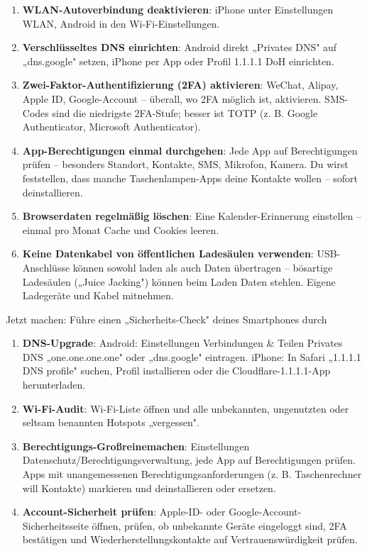 \begin{enumerate}
  \item \textbf{WLAN-Autoverbindung deaktivieren}: iPhone unter Einstellungen WLAN, Android in den Wi-Fi-Einstellungen.
  \item \textbf{Verschlüsseltes DNS einrichten}: Android direkt „Privates DNS" auf „dns.google" setzen, iPhone per App oder Profil 1.1.1.1 DoH einrichten.
  \item \textbf{Zwei-Faktor-Authentifizierung (2FA) aktivieren}: WeChat, Alipay, Apple ID, Google-Account – überall, wo 2FA möglich ist, aktivieren. SMS-Codes sind die niedrigste 2FA-Stufe; besser ist TOTP (z. B. Google Authenticator, Microsoft Authenticator).
  \item \textbf{App-Berechtigungen einmal durchgehen}: Jede App auf Berechtigungen prüfen – besonders Standort, Kontakte, SMS, Mikrofon, Kamera. Du wirst feststellen, dass manche Taschenlampen-Apps deine Kontakte wollen – sofort deinstallieren.
  \item \textbf{Browserdaten regelmäßig löschen}: Eine Kalender-Erinnerung einstellen – einmal pro Monat Cache und Cookies leeren.
  \item \textbf{Keine Datenkabel von öffentlichen Ladesäulen verwenden}: USB-Anschlüsse können sowohl laden als auch Daten übertragen – bösartige Ladesäulen („Juice Jacking") können beim Laden Daten stehlen. Eigene Ladegeräte und Kabel mitnehmen.
\end{enumerate}

\begin{tcbpractice}{Jetzt machen: Führe einen „Sicherheits-Check" deines Smartphones durch}
\begin{enumerate}
  \item \textbf{DNS-Upgrade}: Android: Einstellungen Verbindungen \& Teilen Privates DNS „one.one.one.one" oder „dns.google" eintragen. iPhone: In Safari „1.1.1.1 DNS profile" suchen, Profil installieren oder die Cloudflare-1.1.1.1-App herunterladen.
  \item \textbf{Wi-Fi-Audit}: Wi-Fi-Liste öffnen und alle unbekannten, ungenutzten oder seltsam benannten Hotspots „vergessen".
  \item \textbf{Berechtigungs-Großreinemachen}: Einstellungen Datenschutz/Berechtigungsverwaltung, jede App auf Berechtigungen prüfen. Apps mit unangemessenen Berechtigungsanforderungen (z. B. Taschenrechner will Kontakte) markieren und deinstallieren oder ersetzen.
  \item \textbf{Account-Sicherheit prüfen}: Apple-ID- oder Google-Account-Sicherheitsseite öffnen, prüfen, ob unbekannte Geräte eingeloggt sind, 2FA bestätigen und Wiederherstellungskontakte auf Vertrauenswürdigkeit prüfen.
\end{enumerate}

\end{tcbpractice}
